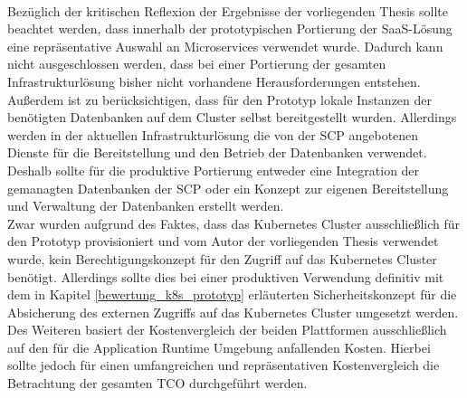 \\
Bezüglich der kritischen Reflexion der Ergebnisse der vorliegenden Thesis sollte beachtet werden, dass innerhalb der prototypischen Portierung der \ac{SaaS}-Lösung eine repräsentative Auswahl an Microservices verwendet wurde. Dadurch kann nicht ausgeschlossen werden, dass bei einer Portierung der gesamten Infrastrukturlösung bisher nicht vorhandene Herausforderungen entstehen.\\
Außerdem ist zu berücksichtigen, dass für den Prototyp lokale Instanzen der benötigten Datenbanken auf dem Cluster selbst bereitgestellt wurden. Allerdings werden in der aktuellen Infrastrukturlösung die von der \ac{SCP} angebotenen Dienste für die Bereitstellung und den Betrieb der Datenbanken verwendet. Deshalb sollte für die produktive Portierung entweder eine Integration der gemanagten Datenbanken der \ac{SCP} oder ein Konzept zur eigenen Bereitstellung und Verwaltung der Datenbanken erstellt werden.\\
Zwar wurden aufgrund des Faktes, dass das Kubernetes Cluster ausschließlich für den Prototyp provisioniert und vom Autor der vorliegenden Thesis verwendet wurde, kein Berechtigungskonzept für den Zugriff auf das Kubernetes Cluster benötigt. Allerdings sollte dies bei einer produktiven Verwendung definitiv mit dem in Kapitel \ref{bewertung_k8s_prototyp} erläuterten Sicherheitskonzept für die Absicherung des externen Zugriffs auf das Kubernetes Cluster umgesetzt werden.\\
Des Weiteren basiert der Kostenvergleich der beiden Plattformen ausschließlich auf den für die Application Runtime Umgebung anfallenden Kosten. Hierbei sollte jedoch für einen umfangreichen und repräsentativen Kostenvergleich die Betrachtung der gesamten \ac{TCO} durchgeführt werden.
 
\newpage
